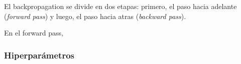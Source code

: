 \documentclass[../../main.tex]{subfiles}
\begin{document}
El backpropagation se divide en dos etapas: primero, el paso hacia adelante (\textit{forward pass})
y luego, el paso hacia atras (\textit{backward pass}).

En el forward pass,


\subsubsection{Hiperparámetros}



\begin{comment}
Actualmente, se utilizan otros optimizadores más sofisticados y eficientes, pero que todos
parten de la idea del Descenso por el Gradiente. Los que usaremos en los experimentos son
el Descenso por el Gradiente Estocástico (\textit{Stochastic Gradient Descent}, SGD) y
Adam (\textit{Adaptive Moment Estimation}), de los cuales se puede leer más en el Capítulo
8 de \cite{deep-learning}.

Ahora bien, recordando que la función \(f\) está fija en todas las entradas y salidas del
conjunto de entrenamiento, hay algoritmos de optimización que utilizan todos estos datos
para  calcular el gradiente, otros que utilizan de a un ejemplo a la vez para calcular el
gradiente y otros que están entre medio de los dos anteriores, es decir utilizan un
subconjunto del conjunto de datos para calcular el gradiente (esto es lo que hace SGD).

Es necesario en este punto introducir el concepto de ``\textbf{época}'' y de
``\textbf{lote}''. Un lote es simplemente una subdivisión de tamaño fijo del conjunto de
entrenamiento (o de test). Dicho esto, se llama época al proceso completo en el cual el
modelo entrena utilizando \textbf{todos} los datos disponibles en el conjunto de
entrenamiento una vez, ya sea recorriéndolos de a lotes o todos de una vez. Si el conjunto
está efectivamente dividido en lotes, una época va a consistir de: \textbf{para cada
lote}, calcular las predicciones en base a los pesos actuales, obtener los errores de cada
muestra del lote, computar los gradientes en base a los ejemplos del lote y actualizar los
pesos. Si no, se hacen los mismos pasos pero para todos los datos de una vez.


\end{comment}
\end{document}
